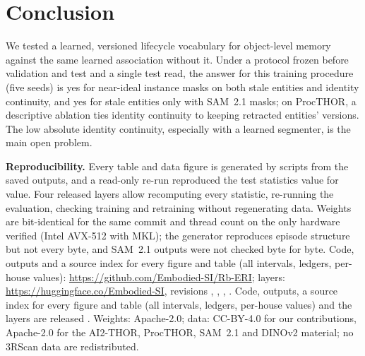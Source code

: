 \section{Conclusion}
\label{sec:conclusion}

We tested a learned, versioned lifecycle vocabulary for object-level memory against the same learned association without it.
Under a protocol frozen before validation and test and a single test read, the answer for this training procedure (five seeds) is yes for near-ideal instance masks on both stale entities and identity continuity, and yes for stale entities only with SAM~2.1 masks; on ProcTHOR, a descriptive ablation ties identity continuity to keeping retracted entities' versions.
The low absolute identity continuity, especially with a learned segmenter, is the main open problem.

\textbf{Reproducibility.}
Every table and data figure is generated by scripts from the saved outputs, and a read-only re-run reproduced the test statistics value for value.
Four released layers allow recomputing every statistic, re-running the evaluation, checking training and retraining without regenerating data.
Weights are bit-identical for the same commit and thread count on the only hardware verified (Intel AVX-512 with MKL); the generator reproduces episode structure but not every byte, and SAM~2.1 outputs were not checked byte for byte.
\iffinalversion
Code, outputs and a source index for every figure and table (all intervals, ledgers, per-house values): \url{https://github.com/Embodied-SI/Rb-ERI}; layers: \url{https://huggingface.co/Embodied-SI}, revisions , , , .
\else
Code, outputs, a source index for every figure and table (all intervals, ledgers, per-house values) and the layers are released \withheld{}.
\fi
Weights: Apache-2.0; data: CC-BY-4.0 for our contributions, Apache-2.0 for the AI2-THOR, ProcTHOR, SAM~2.1 and DINOv2 material; no 3RScan data are redistributed.

